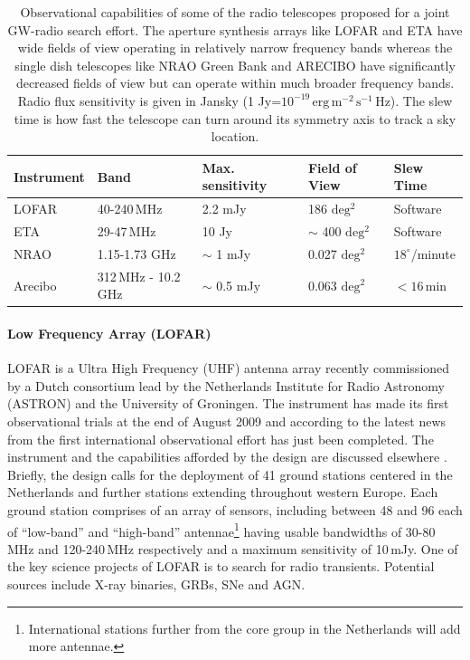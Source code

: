 \begin{table}[ht!]
 \begin{tabular}{|l|l|l|l|l|}\hline
 Instrument & Band & Max. sensitivity & Field of View & Slew Time\\ \hline \hline
 LOFAR & 40-240\,MHz & 2.2 mJy & 186 $\mathrm{deg^2}$ & Software \\
 ETA & 29-47\,MHz & 10 Jy &  $\sim$ 400 $\mathrm{deg^2}$& Software \\
 NRAO & 1.15-1.73 GHz & $\sim$ 1 mJy &
 0.027 $\mathrm{deg^2}$ &  $18^\circ$/minute\\
 Arecibo & 312\,MHz - 10.2\,GHz & $\sim$ 0.5 mJy &
 0.063 $\mathrm{deg^2}$ & $<16$\,min\\
 \hline
 \end{tabular}
 \caption{Observational capabilities of some of the radio telescopes proposed for a joint GW-radio search effort. The aperture synthesis arrays like LOFAR and ETA have wide fields of view operating in relatively narrow frequency bands whereas the single dish telescopes like NRAO Green Bank and ARECIBO have significantly decreased fields of view but can operate within much broader frequency bands. Radio flux sensitivity is given in Jansky (1 Jy=$10^{-19}\,\mathrm {erg}\,\mathrm{m^{-2}\,\mathrm {s^{-1}}\,\mathrm{Hz}}$). The slew time is how fast the telescope can turn around its symmetry axis to track a sky location.}
 \label{radioinst}
\end{table}

\paragraph{Low Frequency Array (LOFAR)} 
LOFAR is a Ultra High Frequency (UHF) antenna array recently commissioned by a Dutch consortium
lead by the Netherlands Institute for Radio Astronomy (ASTRON) and the
University of Groningen. The instrument has made its first observational
trials at the end of August 2009 and according to the latest news from
\cite{Garrett:2009gp} the first international observational effort has
just been completed. The instrument and the capabilities afforded by the
design are discussed elsewhere \cite{lofar_case}. Briefly, the design
calls for the deployment of 41 ground stations centered in the
Netherlands and further stations extending throughout western Europe.
Each ground station comprises of an array of sensors, including between
48 and 96 each of ``low-band'' and ``high-band'' antennae\footnote{International stations further from the core group in
the Netherlands will add more antennae.} having usable bandwidths of
30-80\,MHz and 120-240\,MHz respectively and a maximum sensitivity of
10\,mJy.  One of the key science projects of LOFAR is to search for
radio transients.  Potential sources include X-ray binaries, GRBs, SNe
and AGN. 

